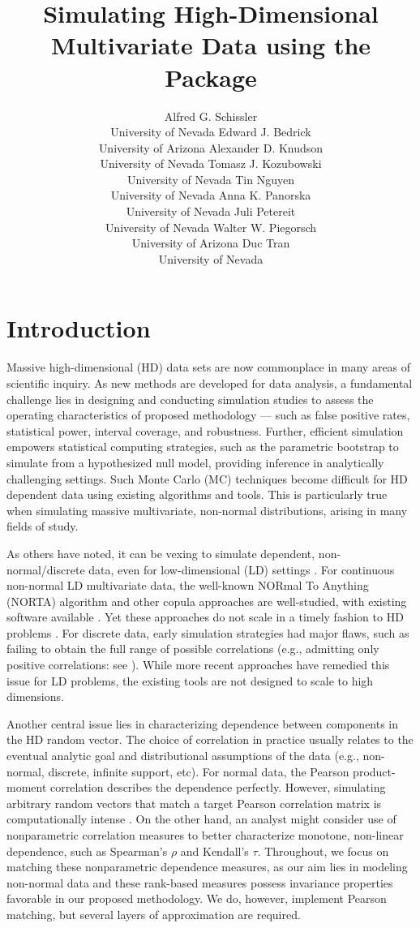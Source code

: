 \documentclass[
]{jss}
\author{
Alfred G. Schissler\\University of Nevada \And Edward J. Bedrick\\University of Arizona \And Alexander D. Knudson\\University of Nevada \AND Tomasz J. Kozubowski\\University of Nevada \And Tin Nguyen\\University of Nevada \And Anna K. Panorska\\University of Nevada \AND Juli Petereit\\University of Nevada \And Walter W. Piegorsch\\University of Arizona \And Duc Tran\\University of Nevada
}
\title{Simulating High-Dimensional Multivariate Data using the \pkg{Bigsimr} Package}
\begin{document}
\clearpage

\hypertarget{introduction}{%
\section{Introduction}\label{introduction}}


Massive high-dimensional (HD) data sets are now commonplace in many areas of scientific inquiry. As new methods are developed for data analysis, a fundamental challenge lies in designing and conducting simulation studies to assess the operating characteristics of proposed methodology --- such as false positive rates, statistical power, interval coverage, and robustness. Further, efficient simulation empowers statistical computing strategies, such as the parametric bootstrap \citep{Chernick2008} to simulate from a hypothesized null model, providing inference in analytically challenging settings. Such Monte Carlo (MC) techniques become difficult for HD dependent data using existing algorithms and tools. This is particularly true when simulating massive multivariate, non-normal distributions, arising in many fields of study.

As others have noted, it can be vexing to simulate dependent, non-normal/discrete data, even for low-dimensional (LD) settings \citep{MB13, XZ19}. For continuous non-normal LD multivariate data, the well-known NORmal To Anything (NORTA) algorithm \citep{Cario1997} and other copula approaches \citep{Nelsen2007} are well-studied, with existing software available \citep{Yan2007, Chen2001}. Yet these approaches do not scale in a timely fashion to HD problems \citep{Li2019gpu}. For discrete data, early simulation strategies had major flaws, such as failing to obtain the full range of possible correlations (e.g., admitting only positive correlations: see \citet{Park1996}). While more recent approaches \citep{MB13, Xia17, BF17} have remedied this issue for LD problems, the existing tools are not designed to scale to high dimensions.

Another central issue lies in characterizing dependence between components in the HD random vector. The choice of correlation in practice usually relates to the eventual analytic goal and distributional assumptions of the data (e.g., non-normal, discrete, infinite support, etc). For normal data, the Pearson product-moment correlation describes the dependence perfectly. However, simulating arbitrary random vectors that match a target Pearson correlation matrix is computationally intense \citep{Chen2001, Xia17}. On the other hand, an analyst might consider use of nonparametric correlation measures to better characterize monotone, non-linear dependence, such as Spearman's \(\rho\) and Kendall's \(\tau\). Throughout, we focus on matching these nonparametric dependence measures, as our aim lies in modeling non-normal data and these rank-based measures possess invariance properties favorable in our proposed methodology. We do, however, implement Pearson matching, but several layers of approximation are required.
\end{document}
